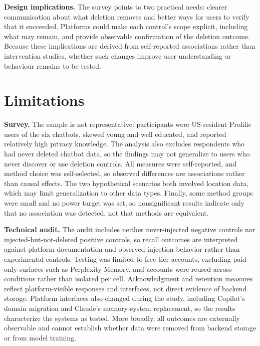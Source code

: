 \documentclass[conference,compsoc]{IEEEtran}
\begin{document}
\textbf{Design implications.} The survey points to two practical needs: clearer communication about what deletion removes and better ways for users to verify that it succeeded. Platforms could make each control's scope explicit, including what may remain, and provide observable confirmation of the deletion outcome. Because these implications are derived from self-reported associations rather than intervention studies, whether such changes improve user understanding or behaviour remains to be tested.

\section{Limitations}

\textbf{Survey.} The sample is not representative: participants were US-resident Prolific users of the six chatbots, skewed young and well educated, and reported relatively high privacy knowledge. The analysis also excludes respondents who had never deleted chatbot data, so the findings may not generalize to users who never discover or use deletion controls. All measures were self-reported, and method choice was self-selected, so observed differences are associations rather than causal effects. The two hypothetical scenarios both involved location data, which may limit generalization to other data types. Finally, some method groups were small and no power target was set, so nonsignificant results indicate only that no association was detected, not that methods are equivalent.

\textbf{Technical audit.} The audit includes neither never-injected negative controls nor injected-but-not-deleted positive controls, so recall outcomes are interpreted against platform documentation and observed injection behavior rather than experimental controls. Testing was limited to free-tier accounts, excluding paid-only surfaces such as Perplexity Memory, and accounts were reused across conditions rather than isolated per cell. Acknowledgment and retention measures reflect platform-visible responses and interfaces, not direct evidence of backend storage. Platform interfaces also changed during the study, including Copilot's domain migration and Claude's memory-system replacement, so the results characterize the systems as tested. More broadly, all outcomes are externally observable and cannot establish whether data were removed from backend storage or from model training.
\end{document}
